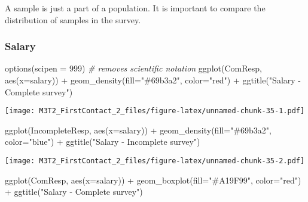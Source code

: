 \documentclass[
]{article}
\newenvironment{Shaded}{\begin{snugshade}}{\end{snugshade}}
\newcommand{\AttributeTok}[1]{\textcolor[rgb]{0.77,0.63,0.00}{#1}}
\newcommand{\CommentTok}[1]{\textcolor[rgb]{0.56,0.35,0.01}{\textit{#1}}}
\newcommand{\DecValTok}[1]{\textcolor[rgb]{0.00,0.00,0.81}{#1}}
\newcommand{\FunctionTok}[1]{\textcolor[rgb]{0.00,0.00,0.00}{#1}}
\newcommand{\NormalTok}[1]{#1}
\newcommand{\SpecialCharTok}[1]{\textcolor[rgb]{0.00,0.00,0.00}{#1}}
\newcommand{\StringTok}[1]{\textcolor[rgb]{0.31,0.60,0.02}{#1}}
\begin{document}
A sample is just a part of a population. It is important to compare the
distribution of samples in the survey.

\hypertarget{salary-1}{%
\subsubsection{Salary}\label{salary-1}}

\begin{Shaded}
\begin{Highlighting}[]
\FunctionTok{options}\NormalTok{(}\AttributeTok{scipen =} \DecValTok{999}\NormalTok{) }\CommentTok{\# removes scientific notation}
\FunctionTok{ggplot}\NormalTok{(ComResp, }\FunctionTok{aes}\NormalTok{(}\AttributeTok{x=}\NormalTok{salary)) }\SpecialCharTok{+} \FunctionTok{geom\_density}\NormalTok{(}\AttributeTok{fill=}\StringTok{"\#69b3a2"}\NormalTok{, }\AttributeTok{color=}\StringTok{"red"}\NormalTok{) }\SpecialCharTok{+} \FunctionTok{ggtitle}\NormalTok{(}\StringTok{"Salary {-} Complete survey"}\NormalTok{)}
\end{Highlighting}
\end{Shaded}

\texttt{[image: M3T2\_FirstContact\_2\_files/figure-latex/unnamed-chunk-35-1.pdf]}

\begin{Shaded}
\begin{Highlighting}[]
\FunctionTok{ggplot}\NormalTok{(IncompleteResp, }\FunctionTok{aes}\NormalTok{(}\AttributeTok{x=}\NormalTok{salary)) }\SpecialCharTok{+} \FunctionTok{geom\_density}\NormalTok{(}\AttributeTok{fill=}\StringTok{"\#69b3a2"}\NormalTok{, }\AttributeTok{color=}\StringTok{"blue"}\NormalTok{) }\SpecialCharTok{+} \FunctionTok{ggtitle}\NormalTok{(}\StringTok{"Salary {-} Incomplete survey"}\NormalTok{)}
\end{Highlighting}
\end{Shaded}

\texttt{[image: M3T2\_FirstContact\_2\_files/figure-latex/unnamed-chunk-35-2.pdf]}

\begin{Shaded}
\begin{Highlighting}[]
\FunctionTok{ggplot}\NormalTok{(ComResp, }\FunctionTok{aes}\NormalTok{(}\AttributeTok{x=}\NormalTok{salary)) }\SpecialCharTok{+} \FunctionTok{geom\_boxplot}\NormalTok{(}\AttributeTok{fill=}\StringTok{"\#A19F99"}\NormalTok{, }\AttributeTok{color=}\StringTok{"red"}\NormalTok{)  }\SpecialCharTok{+} \FunctionTok{ggtitle}\NormalTok{(}\StringTok{"Salary {-} Complete survey"}\NormalTok{)}
\end{Highlighting}
\end{Shaded}
\end{document}

